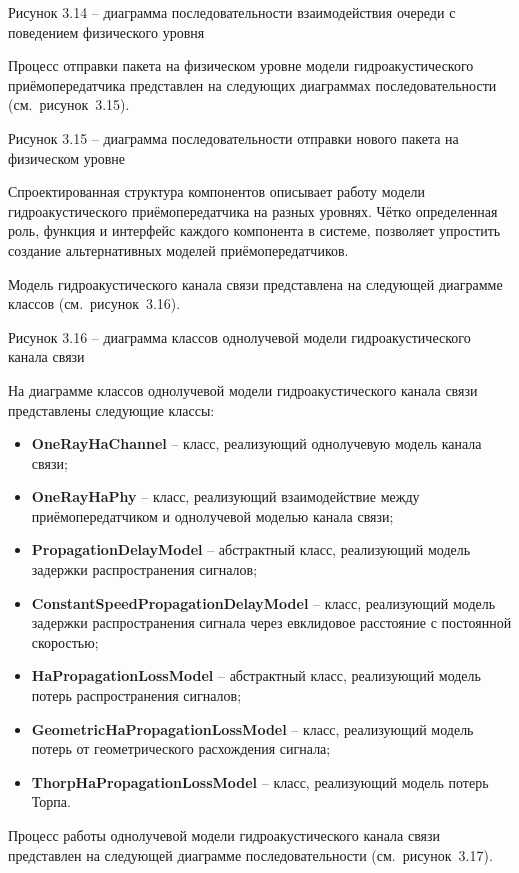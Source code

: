 Рисунок 3.14 -- диаграмма последовательности взаимодействия очереди с
поведением физического уровня

Процесс отправки пакета на физическом уровне модели гидроакустического
приёмопередатчика представлен на следующих диаграммах последовательности
(см.~рисунок~3.15).

Рисунок 3.15 -- диаграмма последовательности отправки нового пакета на
физическом уровне

Спроектированная структура компонентов описывает работу модели
гидроакустического приёмопередатчика на разных уровнях. Чётко
определенная роль, функция и интерфейс каждого компонента в системе,
позволяет упростить создание альтернативных моделей приёмопередатчиков.

Модель гидроакустического канала связи представлена на следующей
диаграмме классов (см.~рисунок~3.16).

Рисунок 3.16 -- диаграмма классов однолучевой модели гидроакустического
канала связи

На диаграмме классов однолучевой модели гидроакустического канала связи
представлены следующие классы:

\begin{itemize}
\item
  \textbf{OneRayHaChannel} -- класс, реализующий однолучевую модель
  канала связи;
\item
  \textbf{OneRayHaPhy} -- класс, реализующий взаимодействие между
  приёмопередатчиком и однолучевой моделью канала связи;
\item
  \textbf{PropagationDelayModel} -- абстрактный класс, реализующий
  модель задержки распространения сигналов;
\item
  \textbf{ConstantSpeedPropagationDelayModel} -- класс, реализующий
  модель задержки распространения сигнала через евклидовое расстояние с
  постоянной скоростью;
\item
  \textbf{HaPropagationLossModel} -- абстрактный класс, реализующий
  модель потерь распространения сигналов;
\item
  \textbf{GeometricHaPropagationLossModel} -- класс, реализующий модель
  потерь от геометрического расхождения сигнала;
\item
  \textbf{ThorpHaPropagationLossModel} -- класс, реализующий модель
  потерь Торпа.
\end{itemize}

Процесс работы однолучевой модели гидроакустического канала связи
представлен на следующей диаграмме последовательности
(см.~рисунок~3.17).

